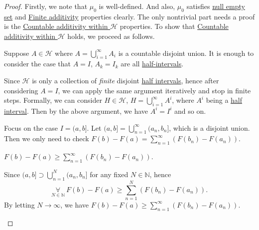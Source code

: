 \begin{proof}
	Firstly, we note that \(\mu _0\) is well-defined. And also, \(\mu _0\) satisfies \hyperref[def:pre-measure-null-empty-set]{null empty set} and \hyperref[def:pre-measure-finite-additivity]{Finite additivity} properties clearly. The only nontrivial part needs a proof is the \hyperref[def:pre-measure-countable-additivity-within-the-algebra]{Countable additivity within \(\mathcal{H}\)} properties. To show that \hyperref[def:pre-measure-countable-additivity-within-the-algebra]{Countable additivity within \(\mathcal{H}\)} holds, we proceed as follows.

	Suppose \(A\in \mathcal{H} \) where \(A = \bigcup_{i=1}^{\infty} A_{i}\) is a countable disjoint union. It is enough to consider the case that \(A = I\), \(A_{k} = I_{k}\) are all \hyperref[def:half-intervals]{half-intervals}.
	\begin{remark}
		Since \(\mathcal{H}\) is only a collection of \emph{finite} disjoint \hyperref[def:half-intervals]{half intervals}, hence after considering \(A = I\), we can apply the same argument iteratively and stop in finite steps. Formally, we can consider \(H\in \mathcal{H} \), \(H = \bigcup_{i=1}^{\infty} A^{i}\), where \(A^i\) being a \hyperref[def:half-intervals]{half interval}. Then by the above argument, we have \(A^i = I^i\) and so on.
	\end{remark}

	Focus on the case \(I = (a, b]\). Let \((a, b] = \bigcup_{n=1}^{\infty} (a_{n}, b_{n}]\), which is a disjoint union. Then we only need to check \(F(b) - F(a) = \sum_{n=1}^{\infty} \left(F(b_{n}) - F(a_{n})\right)\).

	\begin{claim}
		\(F(b) - F(a) \geq \sum_{n=1}^{\infty} (F(b_{n} ) - F(a_{n} ))\).
	\end{claim}
	\begin{explanation}
		Since \((a, b]\supset \bigcup_{n=1}^{N} (a_{n}, b_{n}]\) for any fixed \(N\in\mathbb{N} \), hence
		\[
			\underset{N\in\mathbb{N} }{\forall}\ F(b) - F(a) \geq \sum_{n=1}^{N} \left(F(b_{n}) - F(a_{n})\right).
		\]
		By letting \(N \to \infty\), we have \(F(b) - F(a) \geq \sum_{n=1}^{\infty} \left(F(b_{n}) - F(a_{n})\right)\).
	\end{explanation}


\end{proof}
